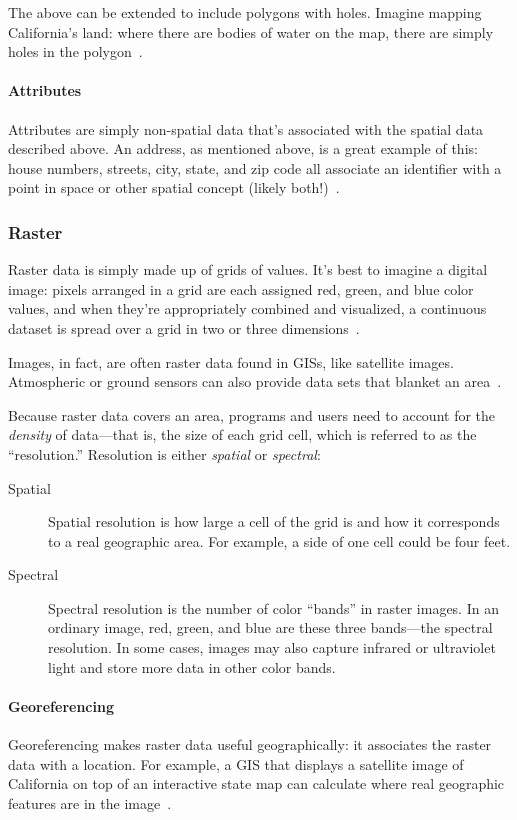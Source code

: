 The above can be extended to include polygons with holes. Imagine mapping California's land: where there are bodies of water on the map, there are simply holes in the polygon~\cite{gentle_intro}.

\paragraph{Attributes}
Attributes are simply non-spatial data that's associated with the spatial data described above. An address, as mentioned above, is a great example of this: house numbers, streets, city, state, and zip code all associate an identifier with a point in space or other spatial concept (likely both!)~\cite{gentle_intro}.

\subsubsection{Raster}
Raster data is simply made up of grids of values. It's best to imagine a digital image: pixels arranged in a grid are each assigned red, green, and blue color values, and when they're appropriately combined and visualized, a continuous dataset is spread over a grid in two or three dimensions~\cite{gentle_intro}.

Images, in fact, are often raster data found in GISs, like satellite images. Atmospheric or ground sensors can also provide data sets that blanket an area~\cite{gentle_intro}.

Because raster data covers an area, programs and users need to account for the \textit{density} of data---that is, the size of each grid cell, which is referred to as the ``resolution.'' Resolution is either \textit{spatial} or \textit{spectral}:

\begin{description}
  \item[Spatial] Spatial resolution is how large a cell of the grid is and how it corresponds to a real geographic area. For example, a side of one cell could be four feet.
  \item[Spectral] Spectral resolution is the number of color ``bands'' in raster images. In an ordinary image, red, green, and blue are these three bands---the spectral resolution. In some cases, images may also capture infrared or ultraviolet light and store more data in other color bands.
\end{description}

\paragraph{Georeferencing}
Georeferencing makes raster data useful geographically: it associates the raster data with a location. For example, a GIS that displays a satellite image of California on top of an interactive state map can calculate where real geographic features are in the image~\cite{gentle_intro}.

